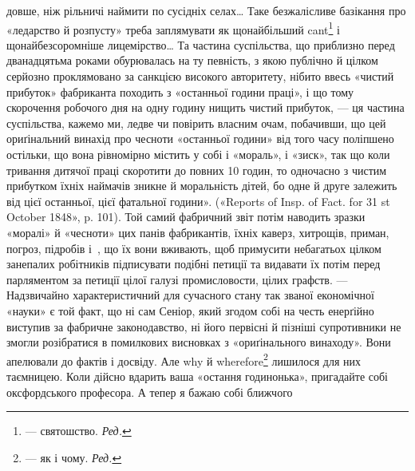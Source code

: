 {довше, ніж рільничі наймити по сусідніх селах\dots{} Таке безжалісливе базікання
про «ледарство й розпусту» треба заплямувати як щонайбільший cant\footnote*{
— святошство. \emph{Ред.}
} і щонайбезсоромніше
лицемірство\dots{} Та частина суспільства, що приблизно перед дванадцятьма роками обурювалась на ту
певність, з якою публічно й цілком серйозно проклямовано за санкцією високого авторитету, нібито
ввесь «чистий прибуток» фабриканта походить з «останньої години праці», і що тому скорочення
робочого дня на одну
годину нищить чистий прибуток, — ця частина суспільства, кажемо ми,
ледве чи повірить власним очам, побачивши, що цей ориґінальний винахід
про чесноти «останньої години» від того часу поліпшено остільки, що вона
рівномірно містить у собі і «мораль», і «зиск», так що коли тривання дитячої праці скоротити до
повних 10 годин, то одночасно з чистим прибутком їхніх наймачів зникне й моральність дітей, бо одне
й друге залежить від цієї останньої, цієї фатальної години». («Reports of Insp. of Fact. for 31 st
October 1848», p. 101). Той самий фабричний звіт потім наводить
зразки «моралі» й «чесноти» цих панів фабрикантів, їхніх каверз, хитрощів,
приман, погроз, підробів і~, що їх вони вживають, щоб примусити небагатьох цілком занепалих
робітників підписувати подібні петиції та видавати їх потім перед парляментом за петиції цілої
галузі промисловости, цілих графств. — Надзвичайно характеристичний для сучасного стану так званої
економічної «науки» є той факт, що ні сам Сеніор, який згодом собі на честь енерґійно виступив за
фабричне законодавство, ні його первісні
й пізніші супротивники не змогли розібратися в помилкових висновках з «ориґінального винаходу». Вони
апелювали до фактів і досвіду. Але why й wherefore\footnote*{
— як і чому. \emph{Ред.}
} лишилося для них таємницею.}
Коли дійсно вдарить ваша «остання годинонька», пригадайте собі оксфордського професора. А тепер я
бажаю собі ближчого
\parbreak{}  %
